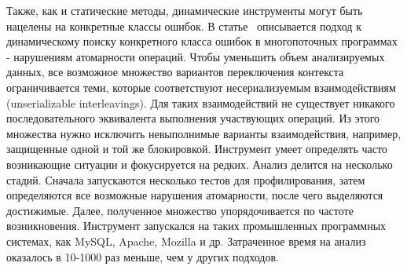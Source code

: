 Также, как и статические методы, динамические инструменты могут быть нацелены на конкретные классы ошибок. В статье~\cite{Park:2009:ASPLOS,Park:2009:SIGARCH,Park:2009} описывается подход к динамическому поиску конкретного класса ошибок в многопоточных программах - нарушениям атомарности операций. Чтобы уменьшить объем анализируемых данных, все возможное множество вариантов переключения контекста ограничивается теми, которые соответствуют несериализуемым взаимодействиям (unserializable interleavings). Для таких взаимодействий не существует никакого последовательного эквивалента выполнения участвующих операций. Из этого множества нужно исключить невыполнимые варианты взаимодействия, например, защищенные одной и той же блокировкой. Инструмент умеет определять часто возникающие ситуации и фокусируется на редких. Анализ делится на несколько стадий. Сначала запускаются несколько тестов для профилирования, затем определяются все возможные нарушения атомарности, после чего выделяются достижимые. Далее, полученное множество упорядочивается по частоте возникновения.
Инструмент запускался на таких промышленных программных системах, как MySQL, Apache, Mozilla и др. Затраченное время на анализ оказалось в 10-1000 раз меньше, чем у других подходов. 

